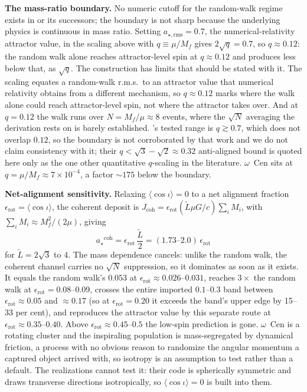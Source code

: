 \documentclass[11pt]{article}
\newcommand{\astar}{\ensuremath{a_\star}}
\newcommand{\ocen}{\ensuremath{\omega}~Cen}
\begin{document}
\textbf{The mass-ratio boundary.} No numeric cutoff for the random-walk regime exists in \citet{HughesBlandford2003} or its successors; the boundary is not sharp because the underlying physics is continuous in mass ratio. Setting $a_{\star,\mathrm{rms}} = 0.7$, the numerical-relativity attractor value, in the scaling above with $q \equiv \mu/M_{f}$ gives $2\sqrt{q} = 0.7$, so $q \approx 0.12$: the random walk alone reaches attractor-level spin at $q \approx 0.12$ and produces less below that, as $\sqrt q$. The construction has limits that should be stated with it. The scaling equates a random-walk r.m.s.\ to an attractor value that numerical relativity obtains from a different mechanism, so $q \approx 0.12$ marks where the walk alone could reach attractor-level spin, not where the attractor takes over. And at $q = 0.12$ the walk runs over $N = M_{f}/\mu \approx 8$ events, where the $\sqrt N$ averaging the derivation rests on is barely established. \citet{Fishbach2017}'s tested range is $q \gtrsim 0.7$, which does not overlap $0.12$, so the boundary is not corroborated by that work and we do not claim consistency with it; their $q < \sqrt3-\sqrt2 \approx 0.32$ anti-aligned bound is quoted here only as the one other quantitative $q$-scaling in the literature. \ocen{} sits at $q = \mu/M_{f} \approx 7\times10^{-4}$, a factor $\sim 175$ below the boundary.

\textbf{Net-alignment sensitivity.} Relaxing $\langle\cos\iota\rangle = 0$ to a net alignment fraction $\epsilon_{\mathrm{rot}} = \langle\cos\iota\rangle$, the coherent deposit is $J_{\mathrm{coh}} = \epsilon_{\mathrm{rot}}(\tilde L\mu G/c)\sum_{i} M_{i}$, with $\sum_{i} M_{i} \approx M_{f}^{2}/(2\mu)$, giving
\begin{equation}
\astar^{\mathrm{coh}} = \epsilon_{\mathrm{rot}}\,\frac{\tilde L}{2} = (1.73\text{--}2.0)\,\epsilon_{\mathrm{rot}}
\end{equation}
for $\tilde L = 2\sqrt3$ to $4$. The mass dependence cancels: unlike the random walk, the coherent channel carries no $\sqrt N$ suppression, so it dominates as soon as it exists. It equals the random walk's $0.053$ at $\epsilon_{\mathrm{rot}} \approx
0.026$--$0.031$, reaches $3\times$ the random walk at $\epsilon_{\mathrm{rot}}
= 0.08$--$0.09$, crosses the entire imported $0.1$--$0.3$ band between
$\epsilon_{\mathrm{rot}} \approx 0.05$ and $\approx 0.17$ (so at
$\epsilon_{\mathrm{rot}} = 0.20$ it exceeds the band's upper edge by 15--33
per cent), and reproduces the attractor value by this separate route at
$\epsilon_{\mathrm{rot}} \approx 0.35$--$0.40$. Above $\epsilon_{\mathrm{rot}}
\approx 0.45$--$0.5$ the low-spin prediction is gone. \ocen{} is a rotating cluster and the inspiraling population is mass-segregated by dynamical friction, a process with no obvious reason to randomize the angular momentum a captured object arrived with, so isotropy is an assumption to test rather than a default. The \citet{GonzalezPrieto2025} realizations cannot test it: their code is spherically symmetric and draws transverse directions isotropically, so $\langle\cos\iota\rangle = 0$ is built into them.
\end{document}
